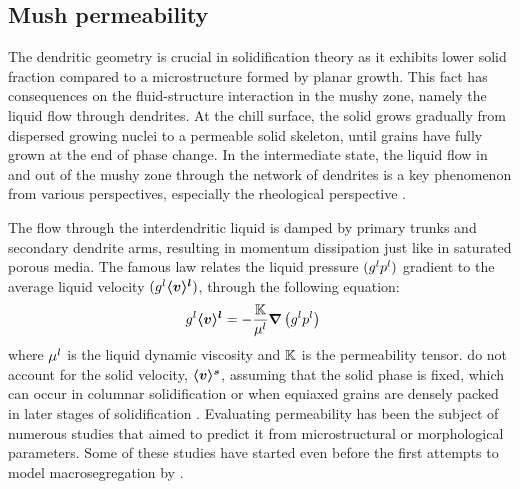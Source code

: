 \subsection{Mush permeability}

The dendritic geometry is crucial in solidification theory as it exhibits lower solid 
fraction compared to a microstructure formed by planar growth.
This fact has consequences on the fluid-structure interaction in the mushy zone, namely 
the liquid flow through dendrites. At the chill surface,
the solid  grows gradually from dispersed growing nuclei to a permeable solid skeleton, 
until grains have fully grown at the end of phase change.
In the intermediate state, the liquid flow in and out of the mushy zone through the network 
of dendrites is a key phenomenon from various perspectives, 
especially the rheological perspective .


The flow through the interdendritic liquid is damped by primary trunks and secondary 
dendrite arms, resulting in momentum dissipation just like in saturated porous media. 
The famous \citet{darcy_les_1856} law relates the liquid pressure $({g^l} {p^l})$ gradient to 
the average liquid velocity $({g^l} \boldsymbol{\langle v \rangle^l})$, 
through the following equation:
\begin{align}
\label{eq:darcy}
& {g^l} \boldsymbol{\langle v \rangle^l} =-\frac{\mathbb{K}}{\mu^l} \boldsymbol{\nabla} \left( {g^l} {p^l} \right)
\end{align}
where $\mu^l$ is the liquid dynamic viscosity and $\mathbb{K}$ is the permeability tensor.
 do not account for the solid velocity, $\boldsymbol{\langle v \rangle^s}$, assuming that the solid phase is fixed,
which can occur in columnar solidification or when equiaxed grains are densely packed in later stages of solidification \citep{rappaz_numerical_2003}.
Evaluating permeability has been the subject of numerous studies that aimed
to predict it from microstructural or morphological parameters.
Some of these studies have started even before the first attempts to model macrosegregation by 
\citet{flemings_macrosegregation:_1967, flemings_macrosegregation:_1968-1,flemings_macrosegregation:_1968}. 

